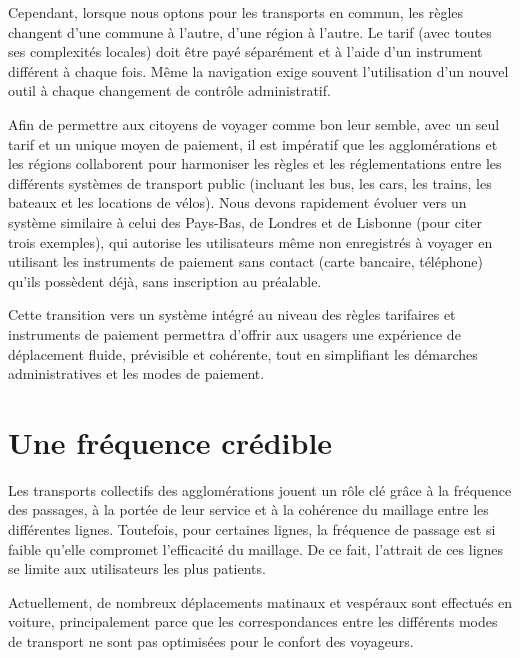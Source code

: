 Cependant, lorsque nous optons pour les transports en commun, les
règles changent d'une commune à l'autre, d'une région à l’autre. Le
tarif (avec toutes ses complexités locales) doit être payé séparément
et à l'aide d'un instrument différent à chaque fois. Même la
navigation exige souvent l'utilisation d'un nouvel outil à chaque
changement de contrôle administratif.

Afin de permettre aux citoyens de voyager comme bon leur semble, avec
un seul tarif et un unique moyen de paiement, il est impératif que les
agglomérations et les régions collaborent pour harmoniser les règles
et les réglementations entre les différents systèmes de transport
public (incluant les bus, les cars, les trains, les bateaux et les
locations de vélos). Nous devons rapidement évoluer vers un système
similaire à celui des Pays-Bas, de Londres et de Lisbonne (pour citer
trois exemples), qui autorise les utilisateurs même non enregistrés à
voyager en utilisant les instruments de paiement sans contact (carte
bancaire, téléphone) qu'ils possèdent déjà, sans inscription au
préalable.

Cette transition vers un système intégré au niveau des règles
tarifaires et instruments de paiement permettra d'offrir aux usagers
une expérience de déplacement fluide, prévisible et cohérente, tout en
simplifiant les démarches administratives et les modes de paiement.





\section{Une fréquence crédible}

Les transports collectifs des agglomérations jouent un rôle clé grâce
à la fréquence des passages, à la portée de leur service et à la
cohérence du maillage entre les différentes lignes. Toutefois, pour
certaines lignes, la fréquence de passage est si faible qu'elle
compromet l'efficacité du maillage. De ce fait, l'attrait de ces
lignes se limite aux utilisateurs les plus patients.

Actuellement, de nombreux déplacements matinaux et vespéraux sont
effectués en voiture, principalement parce que les correspondances
entre les différents modes de transport ne sont pas optimisées pour le
confort des voyageurs.

